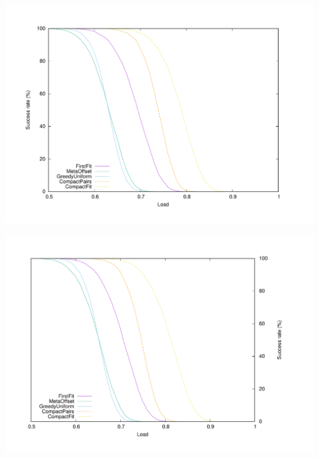\documentclass[a4paper,UKenglish,cleveref, autoref, thm-restate]{lipics-v2019}
\begin{document}
\begin{minipage}[c]{.49\linewidth}

\begin{center}
\includegraphics[scale=0.275]{100messBig}

\label{fig:100messBig}
\end{center} 
\end{minipage}
\begin{minipage}[c]{.45\linewidth}
\begin{center}  
\includegraphics[scale=0.275]{100messSmall}
\label{fig:100messSmall}
\end{center}
\end{minipage}
\end{document}
